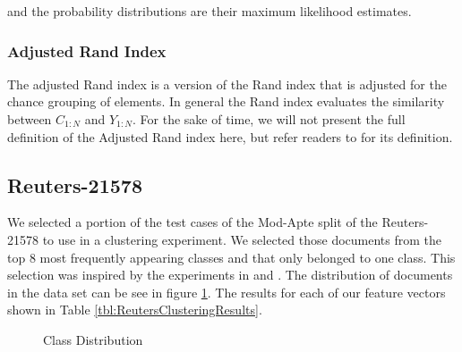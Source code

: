 \documentclass[11pt]{article}
\begin{document}
and the probability distributions are their maximum likelihood estimates. 

\subsubsection{Adjusted Rand Index}

The adjusted Rand index is a version of the Rand index that is adjusted for the chance grouping of elements. In general the Rand index evaluates the similarity between $C_{1:N}$ and $Y_{1:N}$. For the sake of time, we will not present the full definition of the Adjusted Rand index here, but refer readers to \cite{Yeung2001} for its definition.

\subsection{Reuters-21578}

We selected a portion of the test cases of the Mod-Apte split of the Reuters-21578 to use in a clustering experiment. We selected those documents from the top 8 most frequently appearing classes and that only belonged to one class. This selection was inspired by the experiments in \cite{Nastase2007} and \cite{Hofmann2000}. The distribution of documents in the data set can be see in figure \ref{fig:ReutersClassDist}. The results for each of our feature vectors shown in Table \ref{tbl:ReutersClusteringResults}. 

\begin{figure}[H]
\centering
{}
  \caption{Class Distribution}
  \label{fig:ReutersClassDist}

\end{figure}
\end{document}
